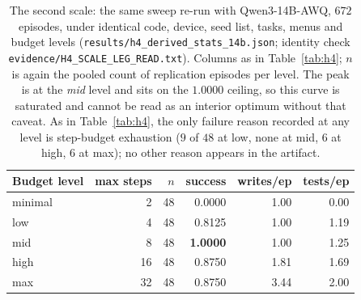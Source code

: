 \documentclass[10pt]{article} %
\begin{document}
\begin{table}[t]
\caption{The second scale: the same sweep re-run with Qwen3-14B-AWQ, $672$ episodes, under
identical code, device, seed list, tasks, menus and budget levels
(\texttt{results/h4\_derived\_stats\_14b.json}; identity check
\texttt{evidence/H4\_SCALE\_LEG\_READ.txt}). Columns as in Table~\ref{tab:h4}; $n$ is again
the pooled count of replication episodes per level. The peak is at the \emph{mid} level and
sits on the $1.0000$ ceiling, so this curve is saturated and cannot be read as an interior
optimum without that caveat. As in Table~\ref{tab:h4}, the only failure reason recorded at
any level is step-budget exhaustion ($9$ of $48$ at low, none at mid, $6$ at high, $6$ at
max); no other reason appears in the artifact.}
\label{tab:h4-14b}
\begin{center}
\small
\begin{tabular}{lrrrrr}
\toprule
Budget level & max steps & $n$ & success & writes/ep & tests/ep \\
\midrule
minimal & 2  & 48 & 0.0000 & 1.00 & 0.00 \\
low     & 4  & 48 & 0.8125 & 1.00 & 1.19 \\
mid     & 8  & 48 & \textbf{1.0000} & 1.00 & 1.25 \\
high    & 16 & 48 & 0.8750 & 1.81 & 1.69 \\
max     & 32 & 48 & 0.8750 & 3.44 & 2.00 \\
\bottomrule
\end{tabular}
\end{center}
\end{table}
\end{document}
